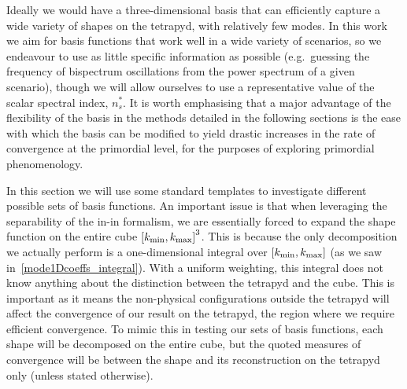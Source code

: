 Ideally we would have a three-dimensional basis that can efficiently
capture a wide variety of shapes on the tetrapyd, with relatively few modes.
In this work we aim for basis functions that work well in a wide variety of scenarios,
so we endeavour to use as little specific information as possible
(e.g.\ guessing the frequency of bispectrum oscillations from
the power spectrum of a given scenario), though we
will allow ourselves to use a representative value
of the scalar spectral index, $n_s^{*}$.   It is worth emphasising that a major advantage of the flexibility of the basis
in the methods detailed in the following sections is the ease with which
the basis can be modified to yield drastic increases in 
the rate of convergence at the primordial level, for the purposes of
exploring primordial phenomenology.


In this section we will use some standard templates to investigate different possible sets of basis functions.
An important issue is that when leveraging the separability of the in-in formalism,
we are essentially forced to expand the shape function on the entire cube ${[{k_\text{min}},{k_\text{max}}]}^3$.
This is because the only decomposition we actually perform is
a one-dimensional integral over $[{k_\text{min}},{k_\text{max}}]$
(as we saw in~\eqref{mode1Dcoeffs_integral}).
With a uniform weighting, this integral does not know anything about the 
distinction between the tetrapyd and the cube.
This is important as it means the non-physical configurations outside the tetrapyd will affect the convergence of our result on the tetrapyd, the region where we require efficient convergence.
To mimic this in testing our sets of basis functions, each shape will be decomposed on the
entire cube, but the quoted measures of convergence will be between the shape
and its reconstruction on the tetrapyd only (unless stated otherwise).

